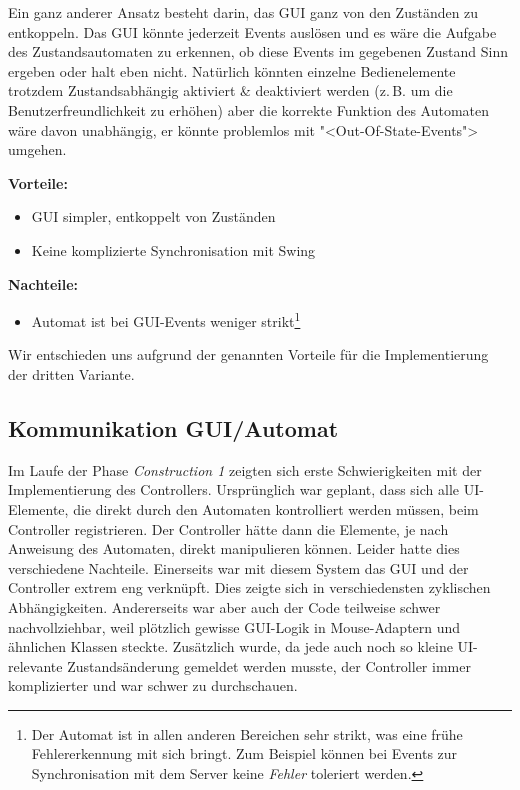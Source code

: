 \documentclass[12pt,halfparskip]{scrartcl}
\begin{document}
Ein ganz anderer Ansatz besteht darin, das GUI ganz von den Zuständen zu entkoppeln. Das GUI könnte jederzeit Events auslösen und es wäre die Aufgabe des Zustandsautomaten zu erkennen, ob diese Events im gegebenen Zustand Sinn ergeben oder halt eben nicht. Natürlich könnten einzelne Bedienelemente trotzdem Zustandsabhängig aktiviert \& deaktiviert werden (z.\,B. um die Benutzerfreundlichkeit zu erhöhen) aber die korrekte Funktion des Automaten wäre davon unabhängig, er könnte problemlos mit "<Out-Of-State-Events"> umgehen.

\textbf{Vorteile:}
\begin{itemize}
	\item GUI simpler, entkoppelt von Zuständen
	\item Keine komplizierte Synchronisation mit Swing
\end{itemize}

\textbf{Nachteile:}
\begin{itemize}
	\item Automat ist bei GUI-Events weniger strikt\footnote{Der Automat ist in allen anderen Bereichen sehr strikt, was eine frühe Fehlererkennung mit sich bringt. Zum Beispiel können bei Events zur Synchronisation mit dem Server keine \emph{Fehler} toleriert werden.}
\end{itemize}

Wir entschieden uns aufgrund der genannten Vorteile für die Implementierung der dritten Variante.

\subsection{Kommunikation GUI/Automat}

Im Laufe der Phase \emph{Construction 1} zeigten sich erste Schwierigkeiten mit der Implementierung des Controllers. Ursprünglich war geplant, dass sich alle UI-Elemente, die direkt durch den Automaten kontrolliert werden müssen, beim Controller registrieren. Der Controller hätte dann die Elemente, je nach Anweisung des Automaten, direkt manipulieren können. Leider hatte dies verschiedene Nachteile. Einerseits war mit diesem System das GUI und der Controller extrem eng verknüpft. Dies zeigte sich in verschiedensten zyklischen Abhängigkeiten. Andererseits war aber auch der Code teilweise schwer nachvollziehbar, weil plötzlich gewisse GUI-Logik in Mouse-Adaptern und ähnlichen Klassen steckte. Zusätzlich wurde, da jede auch noch so kleine UI-relevante Zustandsänderung gemeldet werden musste, der Controller immer komplizierter und war schwer zu durchschauen.
\end{document}
